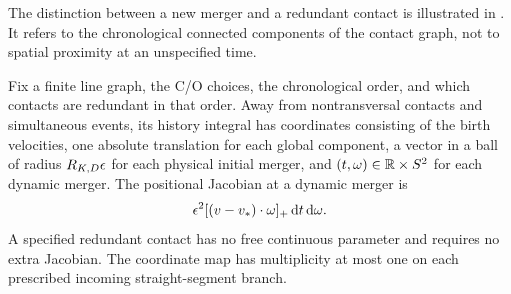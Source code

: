 
The distinction between a new merger and a redundant contact is
illustrated in .  It refers to the
chronological connected components of the contact graph, not to spatial
proximity at an unspecified time.

\begin{lemma}\label{lem:sharp-merger-coordinates}
Fix a finite line graph, the C/O choices, the chronological order, and
which contacts are redundant in that order.  Away from nontransversal
contacts and simultaneous events, its history integral has coordinates
consisting of the birth velocities, one absolute translation for each
global component, a vector in a ball of radius \(R_{K,D}\epsilon\) for each
physical initial merger, and
\((t,\omega)\in\mathbb R\times S^2\) for each dynamic merger.  The positional
Jacobian at a dynamic merger is
\begin{equation}\label{eq:sharp-jacobian}
       \epsilon^2[(v-v_*)\cdot\omega]_+\,\mathrm d t\,\mathrm d\omega.
\end{equation}
A specified redundant contact has no free continuous parameter and
requires no extra Jacobian.  The coordinate map has multiplicity at most
one on each prescribed incoming straight-segment branch.
\end{lemma}

